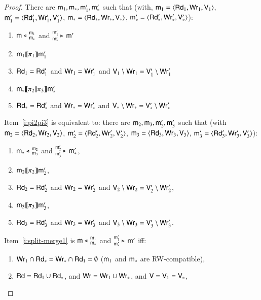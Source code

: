\begin{proof}
There are $\modl_1, \modl_*, \modl'_1, \modl'_*$ such that (with, $\modl_1 = \tuple{\readset_1, \writeset_1, \valuset_1}$, $\modl'_1 = \tuple{\readset'_1, \writeset'_1, \valuset'_1}$, $\modl_* = \tuple{\readset_*, \writeset_*, \valuset_*}$, $\modl'_* = \tuple{\readset'_*, \writeset'_*, \valuset'_*}$):
\begin{enumerate}
\item\label{i:split-merge1}\label{i:lhsfirst} $\splt{\modl}{\modl_1} {\modl_*}$
  and $\mrg{\modl'}{\modl'_1} {\modl'_*}$ 
\item $\modl_1 \intPgm{ \pi_1 } \modl'_1$
\item $\readset_1 = \readset'_1$
  and $\writeset_1 = \writeset'_1$
  and $\valuset_1 \setminus \writeset_1 = \valuset'_1 \setminus \writeset'_1$
\item\label{i:pi2pi3} $\modl_* \intPgm{ \pi_2 \pll \pi_3 } \modl'_*$ 
\item $\readset_* = \readset'_*$
  and $\writeset_* = \writeset'_*$ 
  and $\valuset_* \setminus \writeset_* = \valuset'_* \setminus \writeset'_*$
\end{enumerate}
Item~\ref{i:pi2pi3} is equivalent to: there are $\modl_2, \modl_3, \modl'_2, \modl'_3$ such that  (with $\modl_2 = \tuple{\readset_2, \writeset_2, \valuset_2}$, $\modl'_2 = \tuple{\readset'_2, \writeset'_2, \valuset'_2}$, $\modl_3 = \tuple{\readset_3, \writeset_3, \valuset_3}$, $\modl'_3 = \tuple{\readset'_3, \writeset'_3, \valuset'_3}$):
\begin{enumerate}[resume]
\item\label{i:split-merge2} $\splt{\modl_*}{\modl_2} {\modl_3} $ and $\mrg{\modl_*'}{\modl'_2} {\modl'_3} $,
\item $\modl_2 \intPgm{ \pi_2 } \modl'_2$, 
\item $\readset_2 = \readset'_2 $ and $\writeset_2 = \writeset'_2 $ and $\valuset_2 \setminus \writeset_2 = \valuset'_2 \setminus \writeset'_2$,
\item $\modl_3 \intPgm{ \pi_3 } \modl'_3$, 
\item $\readset_3 = \readset'_3 $ and $\writeset_3 = \writeset'_3 $ and $\valuset_3 \setminus \writeset_3 = \valuset'_3 \setminus \writeset'_3$.
\end{enumerate}
Item~\ref{i:split-merge1} is $\splt{\modl}{\modl_1} {\modl_*} $ and $\mrg{\modl'}{\modl'_1} {\modl'_*} $ iff:
\begin{enumerate}[resume]
\item
  $\writeset_1 \cap \readset_* = \writeset_* \cap \readset_1 = \emptyset$ ($\modl_1$ and $\modl_*$ are RW-compatible),
  \item 
    $\readset = \readset_1 \cup \readset_* $, and $\writeset = \writeset_1 \cup \writeset_*$, and $\valuset = \valuset_1 = \valuset_*$,


\end{enumerate}
\end{proof}
